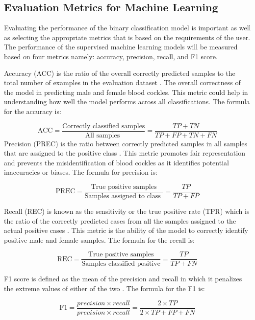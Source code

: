 \subsection{Evaluation Metrics for Machine Learning}
Evaluating the performance of the binary classification model is important as well as selecting the appropriate metrics that is based on the requirements of the user. The performance of the supervised machine learning models will be measured based on four metrics namely: accuracy, precision, recall, and F1 score. 

Accuracy (ACC) is the ratio of the overall correctly predicted samples to the total number of examples in the evaluation dataset \cite{cui2020}. The overall correctness of the model in predicting male and female blood cockles. This metric could help in understanding how well the model performs across all classifications. The formula for the accuracy is: 

\begin{equation}
	\text{ACC} = \frac{\text{Correctly classified samples}} {\text{All samples }} = \frac{TP+ TN}{TP + FP + TN + FN}
	\label{eq:acc}
\end{equation}
Precision (PREC) is the ratio between correctly predicted samples in all samples that are assigned to the positive class \cite{cui2020}. This metric promotes fair representation and prevents the misidentification of blood cockles as it identifies potential inaccuracies or biases. The formula for precision is:


\begin{equation}
	\text{PREC} = \frac{\text{True positive samples}} {\text{Samples assigned to class }} = \frac{TP}{TP + FP}
	\label{eq:prec}
\end{equation}

Recall (REC) is known as the sensitivity or the true positive rate (TPR) which is the ratio of the correctly predicted cases from all the samples assigned to the actual positive cases \cite{cui2020}. This metric is the ability of the model to correctly identify positive male and female samples. The formula for the recall is:

\begin{equation}
	\text{REC} = \frac{\text{True positive samples}} {\text{Samples classified positive}} = \frac{TP}{TP + FN}
	\label{eq:rec}
\end{equation}

F1 score is defined as the mean of the precision and recall in which it penalizes the extreme values of either of the two \cite{cui2020}. The formula for the F1 is: 

\begin{equation}
	\text{F1} = \frac{ precision \times recall }{precision \times recall }= \frac{2 \times TP}{2 \times TP + FP + FN}
	\label{eq:f1}
\end{equation}




